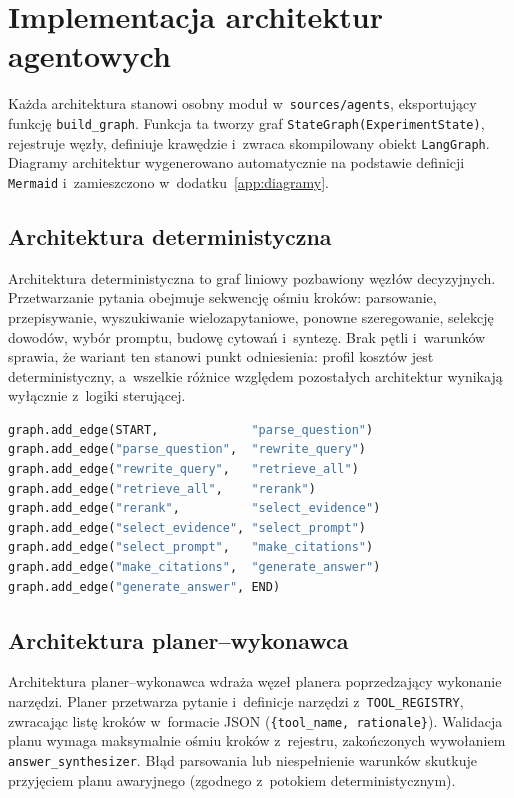 \section{Implementacja architektur agentowych}\label{sec:implementacja-architektur-agentowych}

Każda architektura stanowi osobny moduł w~\texttt{sources/agents}, eksportujący
funkcję \texttt{build\_graph}. Funkcja ta tworzy graf
\texttt{StateGraph(ExperimentState)}, rejestruje węzły, definiuje krawędzie
i~zwraca skompilowany obiekt \texttt{LangGraph}. Diagramy architektur
wygenerowano automatycznie na podstawie definicji \texttt{Mermaid}
i~zamieszczono w~dodatku~\ref{app:diagramy}.

\subsection{Architektura deterministyczna}\label{subsec:architektura-deterministyczna}

Architektura deterministyczna to graf liniowy pozbawiony węzłów decyzyjnych.
Przetwarzanie pytania obejmuje sekwencję ośmiu kroków: parsowanie,
przepisywanie, wyszukiwanie wielozapytaniowe, ponowne szeregowanie, selekcję
dowodów, wybór promptu, budowę cytowań i~syntezę. Brak pętli i~warunków
sprawia, że wariant ten stanowi punkt odniesienia: profil kosztów jest
deterministyczny, a~wszelkie różnice względem pozostałych architektur wynikają
wyłącznie z~logiki sterującej.

\begin{lstlisting}[language=Python,
  caption={Krawędzie grafu deterministycznego},
  label={lst:krawedzie-grafu-deterministycznego}]
graph.add_edge(START,             "parse_question")
graph.add_edge("parse_question",  "rewrite_query")
graph.add_edge("rewrite_query",   "retrieve_all")
graph.add_edge("retrieve_all",    "rerank")
graph.add_edge("rerank",          "select_evidence")
graph.add_edge("select_evidence", "select_prompt")
graph.add_edge("select_prompt",   "make_citations")
graph.add_edge("make_citations",  "generate_answer")
graph.add_edge("generate_answer", END)
\end{lstlisting}

\subsection{Architektura planer--wykonawca}\label{subsec:architektura-planer-wykonawca}

Architektura planer--wykonawca wdraża węzeł planera poprzedzający wykonanie
narzędzi. Planer przetwarza pytanie i~definicje narzędzi
z~\texttt{TOOL\_REGISTRY}, zwracając listę kroków w~formacie JSON
(\texttt{\{tool\_name, rationale\}}). Walidacja planu wymaga maksymalnie ośmiu
kroków z~rejestru, zakończonych wywołaniem \texttt{answer\_synthesizer}. Błąd
parsowania lub niespełnienie warunków skutkuje przyjęciem planu awaryjnego
(zgodnego z~potokiem deterministycznym).

